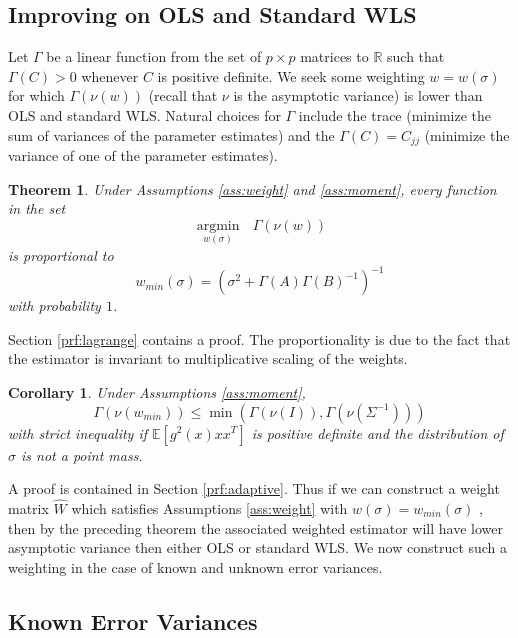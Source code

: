 \documentclass[ejs,ps,preprint]{imsart}
\numberwithin{equation}{section}
\theoremstyle{plain}
\newtheorem{thm}{Theorem}[section]
\newtheorem{cor}{Corollary}[section]
\newcommand{\E}{\mathbb{E}}
\newcommand{\argmin}[1]{\underset{#1}{\operatorname{argmin}}\text{ }}
\def\E{\mathbb{E}}
\begin{document}
\subsection{Improving on OLS and Standard WLS}
\label{sec:improve}
Let $\Gamma$ be a linear function from the set of $p \times p$ matrices to $\mathbb{R}$ such that $\Gamma(C) > 0$ whenever $C$ is positive definite. We seek some weighting $w = w(\sigma)$ for which $\Gamma(\nu(w))$ (recall that $\nu$ is the asymptotic variance) is lower than OLS and standard WLS. Natural choices for $\Gamma$ include the trace (minimize the sum of variances of the parameter estimates) and the $\Gamma(C) = C_{jj}$ (minimize the variance of one of the parameter estimates).

\begin{thm}
\label{thm:lagrange}
Under Assumptions \ref{ass:weight} and \ref{ass:moment}, every function in the set
\begin{equation*}
\argmin{w(\sigma)} \Gamma(\nu(w))
\end{equation*}
is proportional to
\begin{equation}
\label{eq:wmin}
w_{min}(\sigma) = (\sigma^2 + \Gamma(A)\Gamma(B)^{-1})^{-1}
\end{equation}
with probability $1$.
\end{thm}
Section \ref{prf:lagrange} contains a proof. The proportionality is due to the fact that the estimator is invariant to multiplicative scaling of the weights.

\begin{cor}
\label{thm:adaptive}
Under Assumptions \ref{ass:moment},
\begin{equation*}
\Gamma(\nu(w_{min})) \leq \min(\Gamma(\nu(I)),\Gamma(\nu(\Sigma^{-1})))
\end{equation*}
with strict inequality if $\E[g^2(x)xx^T]$ is positive definite and the distribution of $\sigma$ is not a point mass.
\end{cor}
A proof is contained in Section \ref{prf:adaptive}. Thus if we can construct a weight matrix $\widehat{W}$ which satisfies Assumptions \ref{ass:weight} with $w(\sigma) = w_{min}(\sigma)$ , then by the preceding theorem the associated weighted estimator will have lower asymptotic variance then either OLS or standard WLS. We now construct such a weighting in the case of known and unknown error variances.

\subsection{Known Error Variances}
\label{sec:known}
\end{document}
